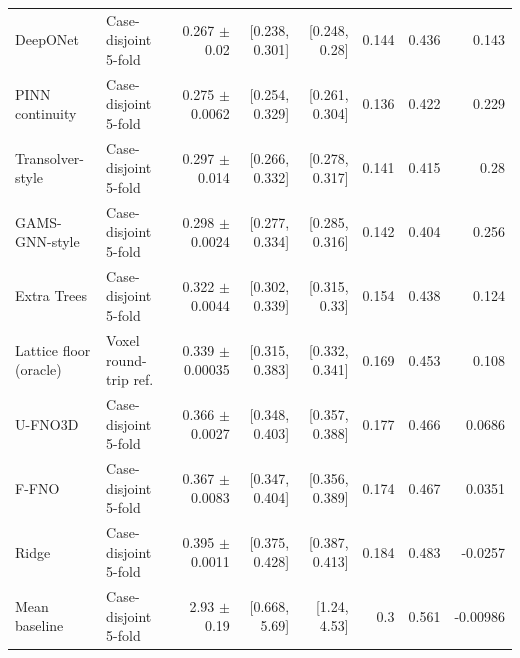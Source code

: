\begin{landscape}
\begin{longtable}{p{3.8cm}p{2.9cm}rrrrrr}
DeepONet & Case-disjoint 5-fold & 0.267 $\pm$ 0.02 & [0.238, 0.301] & [0.248, 0.28] & 0.144 & 0.436 & 0.143 \\
PINN continuity & Case-disjoint 5-fold & 0.275 $\pm$ 0.0062 & [0.254, 0.329] & [0.261, 0.304] & 0.136 & 0.422 & 0.229 \\
Transolver-style & Case-disjoint 5-fold & 0.297 $\pm$ 0.014 & [0.266, 0.332] & [0.278, 0.317] & 0.141 & 0.415 & 0.28 \\
GAMS-GNN-style & Case-disjoint 5-fold & 0.298 $\pm$ 0.0024 & [0.277, 0.334] & [0.285, 0.316] & 0.142 & 0.404 & 0.256 \\
Extra Trees & Case-disjoint 5-fold & 0.322 $\pm$ 0.0044 & [0.302, 0.339] & [0.315, 0.33] & 0.154 & 0.438 & 0.124 \\
Lattice floor (oracle) & Voxel round-trip ref. & 0.339 $\pm$ 0.00035 & [0.315, 0.383] & [0.332, 0.341] & 0.169 & 0.453 & 0.108 \\
U-FNO3D & Case-disjoint 5-fold & 0.366 $\pm$ 0.0027 & [0.348, 0.403] & [0.357, 0.388] & 0.177 & 0.466 & 0.0686 \\
F-FNO & Case-disjoint 5-fold & 0.367 $\pm$ 0.0083 & [0.347, 0.404] & [0.356, 0.389] & 0.174 & 0.467 & 0.0351 \\
Ridge & Case-disjoint 5-fold & 0.395 $\pm$ 0.0011 & [0.375, 0.428] & [0.387, 0.413] & 0.184 & 0.483 & -0.0257 \\
Mean baseline & Case-disjoint 5-fold & 2.93 $\pm$ 0.19 & [0.668, 5.69] & [1.24, 4.53] & 0.3 & 0.561 & -0.00986 \\
\bottomrule\end{longtable}\end{landscape}

